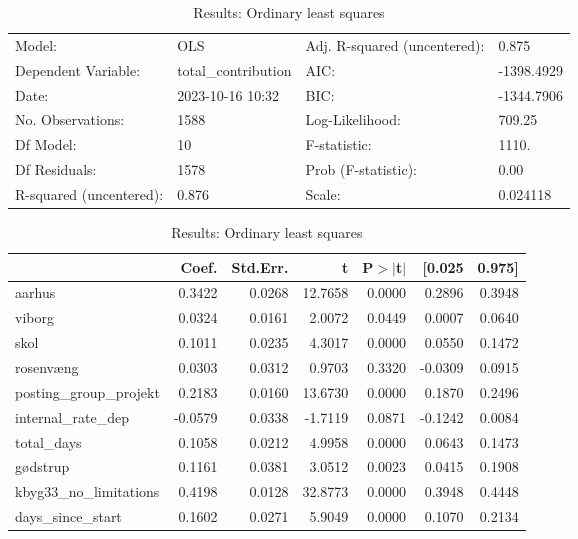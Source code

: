 \begin{table}
\caption{Results: Ordinary least squares}
\label{}
\begin{center}
\begin{tabular}{llll}
\hline
Model:                  & OLS                 & Adj. R-squared (uncentered): & 0.875       \\
Dependent Variable:     & total\_contribution & AIC:                         & -1398.4929  \\
Date:                   & 2023-10-16 10:32    & BIC:                         & -1344.7906  \\
No. Observations:       & 1588                & Log-Likelihood:              & 709.25      \\
Df Model:               & 10                  & F-statistic:                 & 1110.       \\
Df Residuals:           & 1578                & Prob (F-statistic):          & 0.00        \\
R-squared (uncentered): & 0.876               & Scale:                       & 0.024118    \\
\hline
\end{tabular}
\end{center}

\begin{center}
\begin{tabular}{lrrrrrr}
\hline
                        &   Coef. & Std.Err. &       t & P$> |$t$|$ &  [0.025 & 0.975]  \\
\hline
aarhus                  &  0.3422 &   0.0268 & 12.7658 &      0.0000 &  0.2896 & 0.3948  \\
viborg                  &  0.0324 &   0.0161 &  2.0072 &      0.0449 &  0.0007 & 0.0640  \\
skol                    &  0.1011 &   0.0235 &  4.3017 &      0.0000 &  0.0550 & 0.1472  \\
rosenvæng               &  0.0303 &   0.0312 &  0.9703 &      0.3320 & -0.0309 & 0.0915  \\
posting\_group\_projekt &  0.2183 &   0.0160 & 13.6730 &      0.0000 &  0.1870 & 0.2496  \\
internal\_rate\_dep     & -0.0579 &   0.0338 & -1.7119 &      0.0871 & -0.1242 & 0.0084  \\
total\_days             &  0.1058 &   0.0212 &  4.9958 &      0.0000 &  0.0643 & 0.1473  \\
gødstrup                &  0.1161 &   0.0381 &  3.0512 &      0.0023 &  0.0415 & 0.1908  \\
kbyg33\_no\_limitations &  0.4198 &   0.0128 & 32.8773 &      0.0000 &  0.3948 & 0.4448  \\
days\_since\_start      &  0.1602 &   0.0271 &  5.9049 &      0.0000 &  0.1070 & 0.2134  \\
\hline
\end{tabular}
\end{center}


\end{table}
